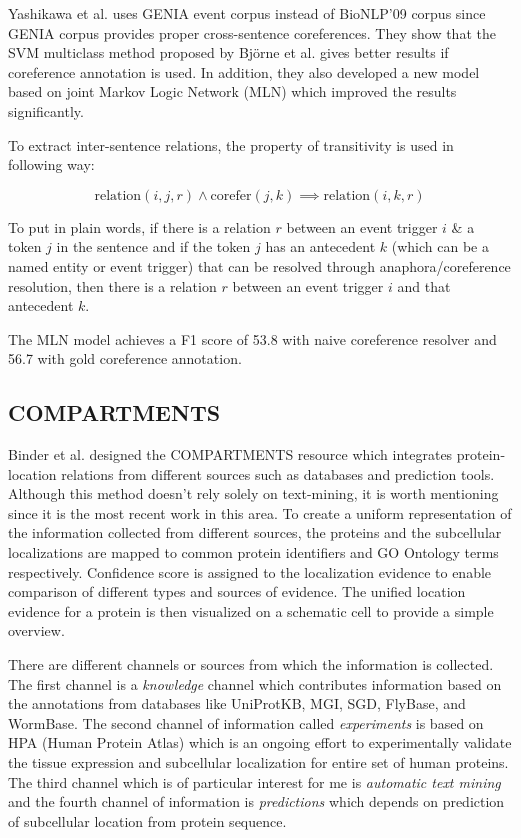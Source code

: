 Yashikawa et al. uses GENIA event corpus instead of BioNLP'09 corpus since GENIA corpus provides proper cross-sentence coreferences. They show that the SVM multiclass method proposed by Björne et al. gives better results if coreference annotation is used. In addition, they also developed a new model based on joint Markov Logic Network (MLN) which improved the results significantly.

To extract inter-sentence relations, the property of transitivity is used in following way:

$$
\text{relation} \left( i,j,r \right) \land \text{corefer} \left(j,k \right) \implies \text{relation} \left( i,k,r \right)
$$

To put in plain words, if there is a relation $r$ between an event trigger $i$ \& a token $j$ in the sentence and if the token $j$ has an antecedent $k$ (which can be a named entity or event trigger) that can be resolved through anaphora/coreference resolution, then there is a relation $r$ between an event trigger $i$ and that antecedent $k$.

The MLN model achieves a F1 score of 53.8 with naive coreference resolver and 56.7 with gold coreference annotation. 

\subsection{COMPARTMENTS}


Binder et al. \cite{binder2014compartments} designed the COMPARTMENTS resource which integrates protein-location relations from different sources such as databases and prediction tools. Although this method doesn't rely solely on text-mining, it is worth mentioning since it is the most recent work in this area. To create a uniform representation of the information collected from different sources, the proteins and the subcellular localizations are mapped to common protein identifiers and GO Ontology terms respectively. Confidence score is assigned to the localization evidence to enable comparison of different types and sources of evidence. The unified location evidence for a protein is then visualized on a schematic cell to  provide a simple overview.

There are different channels or sources from which the information is collected. The first channel is a \textit{knowledge} channel which contributes information based on the annotations from databases like UniProtKB, MGI, SGD, FlyBase, and WormBase. The second channel of information called \textit{experiments} is based on HPA (Human Protein Atlas) which is an ongoing effort to experimentally validate  the tissue expression and subcellular localization for entire set of human proteins. The third channel which is of particular interest for me is \textit{automatic text mining} and the fourth channel of information is \textit{predictions} which depends on prediction of subcellular location from protein sequence.


